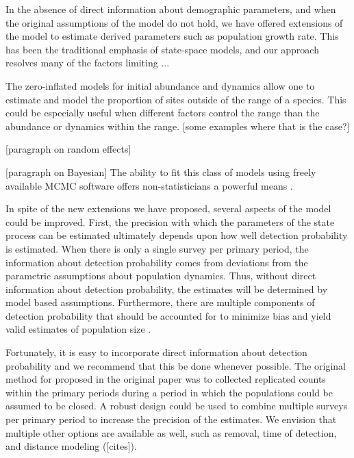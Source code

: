 \documentclass[12pt]{article}
\begin{document}
In the absence of direct information about demographic parameters, and
when the original assumptions of the model do not hold, we have
offered extensions of the model to estimate derived parameters such as
population growth rate. This has been the traditional emphasis of
state-space models, and our approach resolves many of the factors
limiting ...

The zero-inflated models for initial
abundance and dynamics allow one to estimate and model the proportion
of sites outside of the range of a species.  This could be especially
useful when different factors control the range than the abundance or
dynamics within the range.  [some examples where that is the case?]

[paragraph on random effects]


[paragraph on Bayesian]
The ability to fit this class of models using freely available MCMC
software offers non-statisticians a powerful means .

In spite of the new extensions we have proposed, several aspects of
the model could be improved. First, the precision with which the
parameters of the state process can be estimated ultimately depends
upon how well detection probability is estimated. When there is only a
single survey per primary period, the information about detection
probability comes from deviations from the parametric assumptions
about population dynamics. Thus, without direct information about
detection probability, the estimates will be determined by model based
assumptions. Furthermore, there are multiple components of detection
probability that should be accounted for to minimize bias and yield
valid estimates of population size \citep{nichols_etal:2009}.

Fortunately, it is easy to incorporate direct information about
detection probability and we recommend that this be done whenever
possible. The original method for proposed in the original paper was
to collected replicated counts within the primary periods during a
period in which the populations could be assumed to be closed.  A
robust design could be used to combine multiple surveys per primary
period to increase the precision of the estimates. We envision that
multiple other options are available as well, such as removal, time of
detection, and distance modeling ([cites]).
\end{document}
